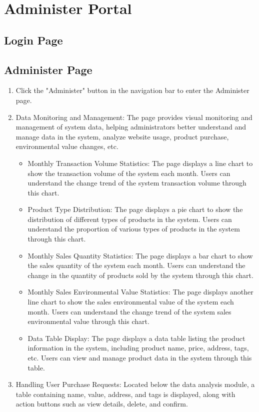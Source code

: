 \documentclass{article}
\begin{document}
\section{Administer Portal}
\subsection{Login Page}
\subsection{Administer Page}
\begin{enumerate}
    \item Click the "Administer" button in the navigation bar to enter the Administer page.
    \item Data Monitoring and Management: The page provides visual monitoring and management of system data, helping administrators better understand and manage data in the system, analyze website usage, product purchase, environmental value changes, etc.
    \begin{itemize}
        \item Monthly Transaction Volume Statistics: The page displays a line chart to show the transaction volume of the system each month. Users can understand the change trend of the system transaction volume through this chart.
        \item Product Type Distribution: The page displays a pie chart to show the distribution of different types of products in the system. Users can understand the proportion of various types of products in the system through this chart.
        \item Monthly Sales Quantity Statistics: The page displays a bar chart to show the sales quantity of the system each month. Users can understand the change in the quantity of products sold by the system through this chart.
        \item Monthly Sales Environmental Value Statistics: The page displays another line chart to show the sales environmental value of the system each month. Users can understand the change trend of the system sales environmental value through this chart.
        \item Data Table Display: The page displays a data table listing the product information in the system, including product name, price, address, tags, etc. Users can view and manage product data in the system through this table.
    \end{itemize}
    \item Handling User Purchase Requests: Located below the data analysis module, a table containing name, value, address, and tags is displayed, along with action buttons such as view details, delete, and confirm.

\end{enumerate}
\end{document}
